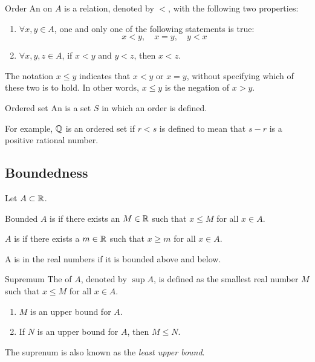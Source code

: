 \begin{defn}{Order}{}
An  on $A$ is a relation, denoted by $<$, with the following two properties:
\begin{enumerate}[label=\textbf{O\arabic*}]
\item $\forall x,y \in A$, one and only one of the following statements is true:
\[ x<y, \quad x=y, \quad y<x \]
\item $\forall x,y,z \in A$, if $x<y$ and $y<z$, then $x<z$.
\end{enumerate}
\end{defn}

\begin{notation}
The notation $x \le y$ indicates that $x<y$ or $x = y$, without specifying which of these two is to hold. In other words, $x \le y$ is the negation of $x > y$.
\end{notation}

\begin{defn}{Ordered set}{}
An  is a set $S$ in which an order is defined.
\end{defn}

For example, $\mathbb Q$ is an ordered set if $r<s$ is defined to mean that $s-r$ is a positive rational number.

\subsection{Boundedness}
Let $A\subset\mathbb R$.

\begin{defn}{Bounded}{}
$A$ is  if there exists an  $M \in \mathbb R$ such that $x \le M$ for all $x\in A$.

$A$ is  if there exists a  $m \in \mathbb R$ such that $x \ge m$ for all $x\in A$.

A is  in the real numbers if it is bounded above and below.
\end{defn}

\begin{defn}{Supremum}{}
The  of $A$, denoted by $\sup A$, is defined as the smallest real number $M$ such that $x \le M$ for all $x\in A$.
\begin{enumerate}[label=(\roman*)]
\item $M$ is an upper bound for $A$.
\item If $N$ is an upper bound for $A$, then $M \le N$.
\end{enumerate}
The suprenum is also known as the \emph{least upper bound}.
\end{defn}

